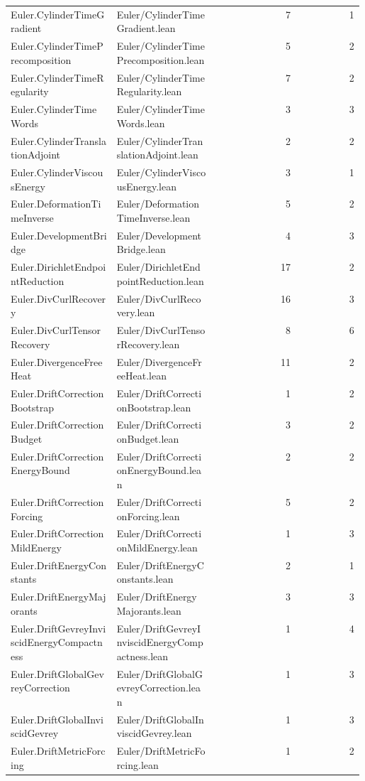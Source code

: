 \begin{longtable}{p{0.30\linewidth}p{0.28\linewidth}rr}
Euler.CylinderTimeGradient & Euler/CylinderTimeGradient.lean & 7 & 1\\
Euler.CylinderTimePrecomposition & Euler/CylinderTimePrecomposition.lean & 5 & 2\\
Euler.CylinderTimeRegularity & Euler/CylinderTimeRegularity.lean & 7 & 2\\
Euler.CylinderTimeWords & Euler/CylinderTimeWords.lean & 3 & 3\\
Euler.CylinderTranslationAdjoint & Euler/CylinderTranslationAdjoint.lean & 2 & 2\\
Euler.CylinderViscousEnergy & Euler/CylinderViscousEnergy.lean & 3 & 1\\
Euler.DeformationTimeInverse & Euler/DeformationTimeInverse.lean & 5 & 2\\
Euler.DevelopmentBridge & Euler/DevelopmentBridge.lean & 4 & 3\\
Euler.DirichletEndpointReduction & Euler/DirichletEndpointReduction.lean & 17 & 2\\
Euler.DivCurlRecovery & Euler/DivCurlRecovery.lean & 16 & 3\\
Euler.DivCurlTensorRecovery & Euler/DivCurlTensorRecovery.lean & 8 & 6\\
Euler.DivergenceFreeHeat & Euler/DivergenceFreeHeat.lean & 11 & 2\\
Euler.DriftCorrectionBootstrap & Euler/DriftCorrectionBootstrap.lean & 1 & 2\\
Euler.DriftCorrectionBudget & Euler/DriftCorrectionBudget.lean & 3 & 2\\
Euler.DriftCorrectionEnergyBound & Euler/DriftCorrectionEnergyBound.lean & 2 & 2\\
Euler.DriftCorrectionForcing & Euler/DriftCorrectionForcing.lean & 5 & 2\\
Euler.DriftCorrectionMildEnergy & Euler/DriftCorrectionMildEnergy.lean & 1 & 3\\
Euler.DriftEnergyConstants & Euler/DriftEnergyConstants.lean & 2 & 1\\
Euler.DriftEnergyMajorants & Euler/DriftEnergyMajorants.lean & 3 & 3\\
Euler.DriftGevreyInviscidEnergyCompactness & Euler/DriftGevreyInviscidEnergyCompactness.lean & 1 & 4\\
Euler.DriftGlobalGevreyCorrection & Euler/DriftGlobalGevreyCorrection.lean & 1 & 3\\
Euler.DriftGlobalInviscidGevrey & Euler/DriftGlobalInviscidGevrey.lean & 1 & 3\\
Euler.DriftMetricForcing & Euler/DriftMetricForcing.lean & 1 & 2\\

\end{longtable}
